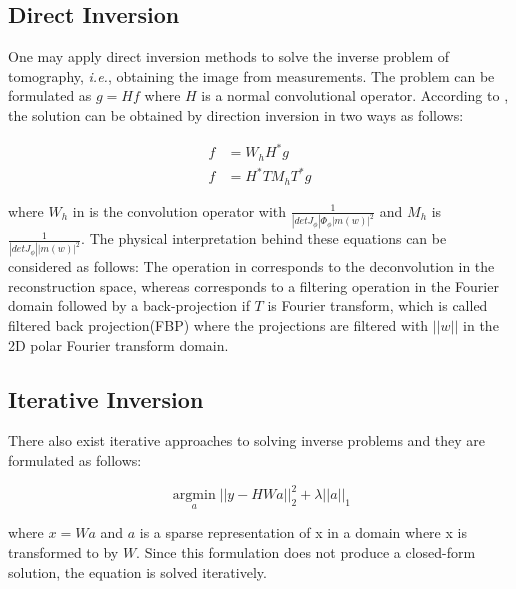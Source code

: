 \documentclass[journal, onecolumn, 11pt]{IEEEtran}
\begin{document}
\subsection{Direct Inversion}

One may apply direct inversion methods to solve the inverse problem of tomography, \textit{i.e.}, obtaining the image from measurements. The problem can be formulated as $g=Hf$ where $H$ is a normal convolutional operator. According to \cite{FBPConvNet}, the solution can be obtained by direction inversion in two ways as follows: 

\begin{align}
    f &= W_h H^\ast g \label{eq:inv1}\\
    f &= H^\ast T M_h T^\ast g \label{eq:inv2}
\end{align}

where $W_h$ in  is the convolution operator with $\frac{1}{|det J_\phi|\Phi_\phi|m(w)|^2}$ and $M_h$ is $\frac{1}{|det J_\phi||m(w)|^2}$. The physical interpretation behind these equations can be considered as follows: The operation in  corresponds to the deconvolution in the reconstruction space, whereas  corresponds to a filtering operation in the Fourier domain followed by a back-projection if $T$ is Fourier transform, which is called filtered back projection(FBP) where the projections are filtered with $||w||$ in the 2D polar Fourier transform domain. 

\subsection{Iterative Inversion}

There also exist iterative approaches to solving inverse problems and they are formulated as follows: 

\begin{equation}
    \operatorname*{argmin}_a ||y-HWa||_2^2 + \lambda ||a||_1 
    \label{eq:TV}
\end{equation}

where $x = Wa$ and $a$ is a sparse representation of x in a domain where x is transformed to by $W$. Since this formulation does not produce a closed-form solution, the equation is solved iteratively. 
\end{document}
